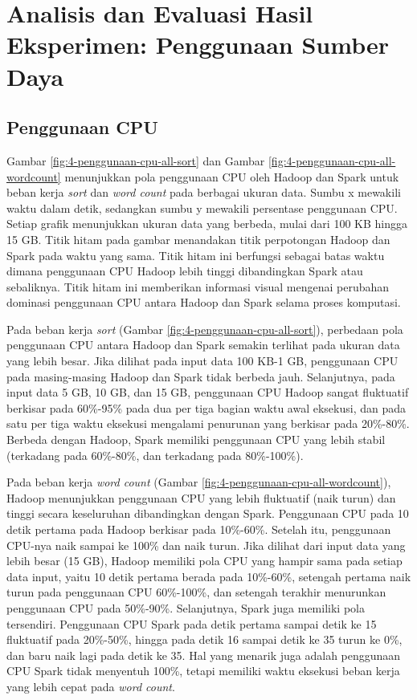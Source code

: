 
\newpage
\section{Analisis dan Evaluasi Hasil Eksperimen: Penggunaan Sumber Daya}
\subsection{Penggunaan CPU}
Gambar \ref{fig:4-penggunaan-cpu-all-sort} dan Gambar \ref{fig:4-penggunaan-cpu-all-wordcount} menunjukkan pola penggunaan CPU oleh Hadoop dan Spark untuk beban kerja \textit{sort} dan \textit{word count} pada berbagai ukuran data. Sumbu x mewakili waktu dalam detik, sedangkan sumbu y mewakili persentase penggunaan CPU. Setiap grafik menunjukkan ukuran data yang berbeda, mulai dari 100 KB hingga 15 GB. Titik hitam pada gambar menandakan titik perpotongan Hadoop dan Spark pada waktu yang sama. Titik hitam ini berfungsi sebagai batas waktu dimana penggunaan CPU Hadoop lebih tinggi dibandingkan Spark atau sebaliknya. Titik hitam ini memberikan informasi visual mengenai perubahan dominasi penggunaan CPU antara Hadoop dan Spark selama proses komputasi.

Pada beban kerja \textit{sort} (Gambar \ref{fig:4-penggunaan-cpu-all-sort}), perbedaan pola penggunaan CPU antara Hadoop dan Spark semakin terlihat pada ukuran data yang lebih besar. Jika dilihat pada input data 100 KB-1 GB, penggunaan CPU pada masing-masing Hadoop dan Spark tidak berbeda jauh. Selanjutnya, pada input data 5 GB, 10 GB, dan 15 GB, penggunaan CPU Hadoop sangat fluktuatif berkisar pada 60\%-95\% pada dua per tiga bagian waktu awal eksekusi, dan pada satu per tiga waktu eksekusi mengalami penurunan yang berkisar pada 20\%-80\%. Berbeda dengan Hadoop, Spark memiliki penggunaan CPU yang lebih stabil (terkadang pada 60\%-80\%, dan terkadang pada 80\%-100\%).

Pada beban kerja \textit{word count} (Gambar \ref{fig:4-penggunaan-cpu-all-wordcount}), Hadoop menunjukkan penggunaan CPU yang lebih fluktuatif (naik turun) dan tinggi secara keseluruhan dibandingkan dengan Spark. Penggunaan CPU pada 10 detik pertama pada Hadoop berkisar pada 10\%-60\%. Setelah itu, penggunaan CPU-nya naik sampai ke 100\% dan naik turun. Jika dilihat dari input data yang lebih besar (15 GB), Hadoop memiliki pola CPU yang hampir sama pada setiap data input, yaitu 10 detik pertama berada pada 10\%-60\%, setengah pertama naik turun pada penggunaan CPU 60\%-100\%, dan setengah terakhir menurunkan penggunaan CPU pada 50\%-90\%. Selanjutnya, Spark juga memiliki pola tersendiri. Penggunaan CPU Spark pada detik pertama sampai detik ke 15 fluktuatif pada 20\%-50\%, hingga pada detik 16 sampai detik ke 35 turun ke 0\%, dan baru naik lagi pada detik ke 35. Hal yang menarik juga adalah penggunaan CPU Spark tidak menyentuh 100\%, tetapi memiliki waktu eksekusi beban kerja yang lebih cepat pada \textit{word count}.

